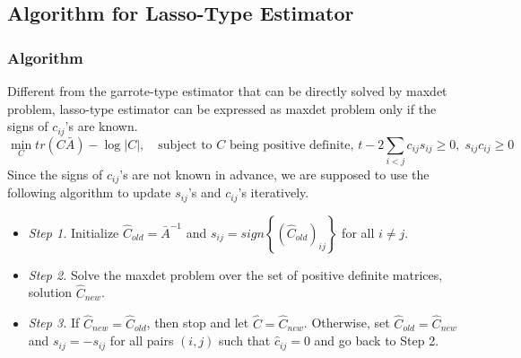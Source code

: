 \subsection*{Algorithm for Lasso-Type Estimator}
\subsubsection*{Algorithm}
Different from the garrote-type estimator that can be directly solved by maxdet problem, lasso-type estimator can be expressed as maxdet problem only if the signs of $c_{ij}$'s are known. 
\[\min_C tr(C\bar{A})-\log|C|,\quad \mbox{subject to }C\mbox{ being positive definite, }t-2\sum_{i<j}c_{ij}s_{ij}\geq 0,\; s_{ij}c_{ij}\geq 0\]
Since the signs of $c_{ij}$'s are not known in advance, we are supposed to use the following algorithm to update $s_{ij}$'s and $c_{ij}$'s iteratively. 
\begin{itemize}
\item \emph{Step 1.} Initialize $\hat{C}_{old}=\bar{A}^{-1}$ and $s_{ij}=sign\left\lbrace (\hat{C}_{old})_{ij}\right\rbrace $ for all $i\neq j$.
\item \emph{Step 2.} Solve the maxdet problem over the set of positive definite matrices, solution $\hat{C}_{new}$. 
\item \emph{Step 3.} If $\hat{C}_{new}=\hat{C}_{old}$, then stop and let $\hat{C}=\hat{C}_{new}$. Otherwise, set $\hat{C}_{old}=\hat{C}_{new}$ and $s_{ij}=-s_{ij}$ for all pairs $(i,j)$ such that $\hat{c}_{ij}=0$ and go back to Step 2.
\end{itemize}

